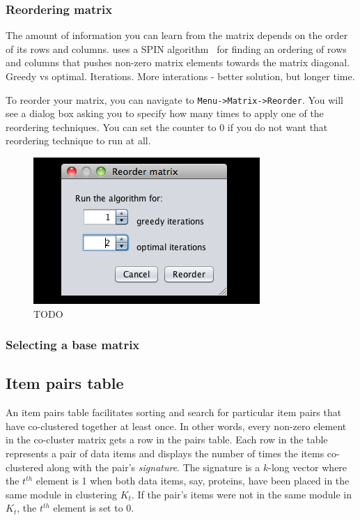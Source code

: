 \subsubsection{Reordering matrix}

The amount of information you can learn from the matrix depends on the order of
its rows and columns. \coral uses a SPIN algorithm~\cite{SPIN} for finding an 
ordering of rows and columns that pushes non-zero matrix elements towards the 
matrix diagonal. Greedy vs optimal. Iterations. More interations - better 
solution, but longer time.

To reorder your matrix, you can navigate to \texttt{Menu->Matrix->Reorder}. 
You will see a dialog box asking you to specify how many times to apply one of 
the reordering techniques. You can set the counter to 0 if you do not want that
reordering technique to run at all.

\begin{figure}
  \centering
  \includegraphics[width=0.45\linewidth]{reorder-diag}
  \caption{TODO}
  \label{fig:reorder-diag}
\end{figure}


\subsubsection{Selecting a base matrix}


\subsection{Item pairs table}

\newcommand{\Athal}{\textit{A. thaliana}}

An item pairs table facilitates sorting and search for particular item pairs 
that have co-clustered together at least once. In other words, every non-zero 
element in the co-cluster matrix gets a row in the pairs table. Each row in the 
table represents a pair of data items and displays the number of times the items 
co-clustered along with the pair's \textit{signature}. The signature is a 
$k$-long vector where the $t^{th}$ element is 1 when both data items, say, 
proteins, have been placed in the same module in clustering $K_{t}$. If the 
pair's items were not in the same module in $K_{t}$, the $t^{th}$ element is set
to 0.

